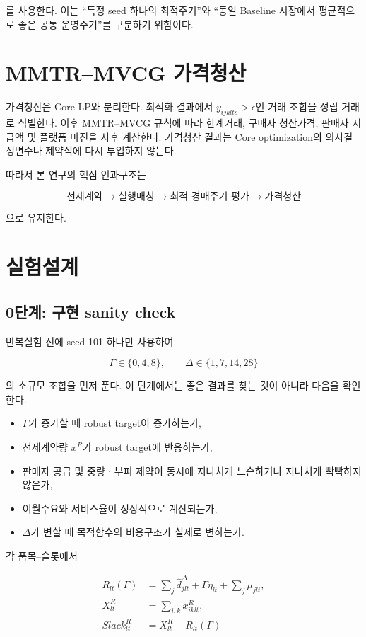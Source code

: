 \documentclass[11pt,a4paper]{article}
\begin{document}
를 사용한다.
이는 ``특정 seed 하나의 최적주기''와 ``동일 Baseline 시장에서 평균적으로 좋은 공통 운영주기''를 구분하기 위함이다.

\section{MMTR--MVCG 가격청산}

가격청산은 Core LP와 분리한다.
최적화 결과에서 $y_{ijklts} > \epsilon$인 거래 조합을 성립 거래로 식별한다.
이후 MMTR--MVCG 규칙에 따라 한계거래, 구매자 청산가격, 판매자 지급액 및 플랫폼 마진을 사후 계산한다.
가격청산 결과는 Core optimization의 의사결정변수나 제약식에 다시 투입하지 않는다.

따라서 본 연구의 핵심 인과구조는

\[
\boxed{
\text{선제계약}
\rightarrow
\text{실행매칭}
\rightarrow
\text{최적 경매주기 평가}
\rightarrow
\text{가격청산}
}
\]

으로 유지한다.

\section{실험설계}

\subsection{0단계: 구현 sanity check}

반복실험 전에 seed 101 하나만 사용하여

\[
\Gamma\in\{0,4,8\},
\qquad
\Delta\in\{1,7,14,28\}
\]

의 소규모 조합을 먼저 푼다.
이 단계에서는 좋은 결과를 찾는 것이 아니라 다음을 확인한다.

\begin{itemize}
\item $\Gamma$가 증가할 때 robust target이 증가하는가,
\item 선제계약량 $x^R$가 robust target에 반응하는가,
\item 판매자 공급 및 중량ㆍ부피 제약이 동시에 지나치게 느슨하거나 지나치게 빡빡하지 않은가,
\item 이월수요와 서비스율이 정상적으로 계산되는가,
\item $\Delta$가 변할 때 목적함수의 비용구조가 실제로 변하는가.
\end{itemize}

각 품목--슬롯에서

\begin{align}
R_{lt}(\Gamma)
&=
\sum_j\hat d^\Delta_{jlt}
+\Gamma\eta_{lt}
+\sum_j\mu_{jlt},\\
X^R_{lt}
&=
\sum_{i,k}x^R_{iklt},\\
Slack^R_{lt}
&=
X^R_{lt}-R_{lt}(\Gamma)
\end{align}
\end{document}
